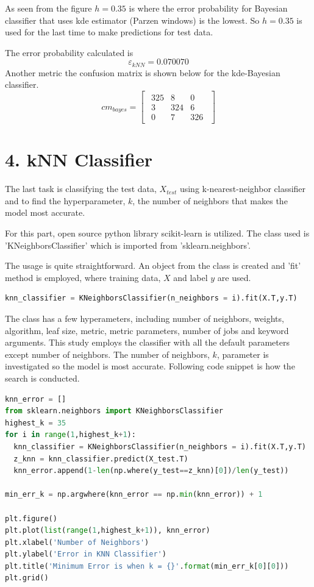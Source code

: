 \documentclass[11pt]{article}
\begin{document}
As seen from the figure $h=0.35$ is where the error probability for Bayesian classifier that uses kde estimator (Parzen windows) is the lowest. So $h=0.35$ is used for the last time to make predictions for test data. \medskip

The error probability calculated is 
$$
\varepsilon_{kNN} = 0.070070
$$
Another metric the confusion matrix is shown below for the kde-Bayesian classifier.
$$
cm_{bayes}=
 \begin{bmatrix}
 \begin{array}{rrr}
325 &  8  &   0 \\
 3 &  324 &   6 \\
  0 &  7 & 326
\end{array}   
\end{bmatrix}
$$


\section*{4. kNN Classifier}
The last task is classifying the test data, $X_{test}$ using k-nearest-neighbor classifier and to find the hyperparameter, $k$, the number of neighbors that makes the model most accurate.

For this part, open source python library scikit-learn is utilized. The class used is 'KNeighborsClassifier' which is imported from 'sklearn.neighbors'. \medskip

The usage is quite straightforward. An object from the class is created and 'fit' method is employed, where training data, $X$ and label $y$ are used.

\begin{lstlisting}[language=Python, caption=kNN Classifier]
knn_classifier = KNeighborsClassifier(n_neighbors = i).fit(X.T,y.T)
\end{lstlisting}

The class has a few hyperameters, including number of neighbors, weights, algorithm, leaf size, metric, metric parameters, number of jobs and keyword arguments. This study employs the classifier with all the default parameters except number of neighbors. The number of neighbors, $k$, parameter is investigated so the model is most accurate. Following code snippet is how the search is conducted.

\begin{lstlisting}[language=Python, caption=kNN Classifier Hyperparameter Search]
knn_error = []
from sklearn.neighbors import KNeighborsClassifier
highest_k = 35
for i in range(1,highest_k+1):
  knn_classifier = KNeighborsClassifier(n_neighbors = i).fit(X.T,y.T)
  z_knn = knn_classifier.predict(X_test.T)
  knn_error.append(1-len(np.where(y_test==z_knn)[0])/len(y_test))

min_err_k = np.argwhere(knn_error == np.min(knn_error)) + 1

plt.figure()
plt.plot(list(range(1,highest_k+1)), knn_error)
plt.xlabel('Number of Neighbors')
plt.ylabel('Error in KNN Classifier')
plt.title('Minimum Error is when k = {}'.format(min_err_k[0][0]))
plt.grid()
\end{lstlisting}
\end{document}
